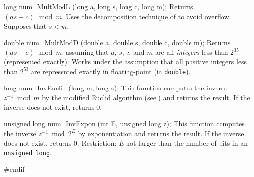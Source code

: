 long num_MultModL (long a, long s, long c, long m);
\endcode
\tab  Returns $(as + c) \mod m$.  Uses the decomposition technique
  of \cite{rLEC91a} to avoid overflow. Supposes that $s < m$.
\endtab
\code


double num_MultModD (double a, double s, double c, double m);
\endcode
 \tab  Returns $(as+c) \mod m$, assuming that
  $a$, $s$, $c$, and $m$ are all {\em integers\/} less than $2^{35}$
  (represented exactly).
  Works under the assumption that all positive integers less than
  $2^{53}$ are represented exactly in floating-point (in {\tt double}).
\endtab
\code


long num_InvEuclid (long m, long z);
\endcode
 \tab  This function computes the inverse $z^{-1}\bmod m$ by the
  modified Euclid algorithm (see \cite[p. 325]{iKNU81a}) and returns
  the result. If the inverse does not exist, returns 0.
\endtab
\code


unsigned long num_InvExpon (int E, unsigned long z);
\endcode
 \tab
  This function computes the inverse  $z^{-1} \bmod 2^E$
  by exponentiation  and returns the result. If the inverse does not
  exist, returns 0.
  Restriction: $E$ not larger than the number of bits
  in an {\tt unsigned long}.
 \endtab

\code
\hide
#endif
\endhide
\endcode
